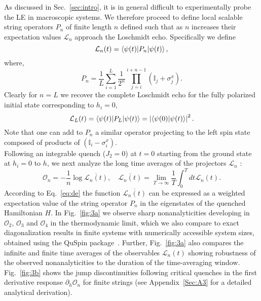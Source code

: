 \documentclass[aps,prx,twocolumn]{revtex4-2}
\begin{document}
As discussed in Sec.~\ref{sec:intro}, it is in general difficult to experimentally probe the LE in macroscopic systems. We therefore proceed to define local scalable string operators $P_n$ of finite length $n$  {defined such that as $n$ increases their expectation values $\mathcal L_n$ approach the Loschmidt echo.  Specifically we define} 
\begin{equation}\label{eq:ln}
\mathcal{L}_n(t)=\braket{\psi(t)|P_n|\psi(t)},
\end{equation}  
where,
 {
\begin{equation}\label{eq:string}
P_n=\frac{1}{L}\sum\limits_{i=1}^{L}\frac{1}{2^n}\prod\limits_{j=i}^{i+n-1}\left(\mathbb{I}_j+\sigma_j^x\right).
\end{equation}
}
Clearly for $n=L$ we recover the complete Loschmidt echo  {for the fully polarized initial state corresponding to $h_i=0$,}
\begin{equation}
\mathcal{L}_L(t)=\braket{\psi(t)|P_L|\psi(t)}=\left|\braket{\psi(0)|\psi(t)}\right|^2.
\end{equation}
{Note that one can add to $P_n$ a similar operator projecting to the  {left} spin state composed of products of $\left(\mathbb{I}_i-\sigma_i^x\right).$}\\

Following an integrable quench ($J_2=0$) at $t=0$ starting from the ground state at $h_i=0$ to $h$,   {we next analyze} the long time averages of the projectors $\mathcal L_n$ {:
\begin{equation}
\label{eq:On_def}
\mathcal{O}_n=-\frac{1}{n}\log \overline {\mathcal L_n(t)},\quad \overline {\mathcal L_n(t)}=\lim\limits_{T\rightarrow\infty}\frac{1}{T}\int_{0}^{T}dt \mathcal L_n(t).
\end{equation}
According to Eq.~\eqref{eq:de} the function $\overline {\mathcal L_n(t)}$ can be expressed as a weighted expectation value of the string operator $P_n$ in the eigenstates of the quenched Hamiltonian $H$}. In Fig.~\ref{fig:3a} we observe sharp nonanalyticities developing in $\mathcal{O}_2$, $\mathcal{O}_3$ and $\mathcal{O}_4$ in the thermodynamic limit,   {which we also compare} to exact diagonalization results in finite systems with numerically accessible system sizes,~ {obtained using the QuSpin package~\cite{bukov1,bukov2}.  Further, Fig.~\ref{fig:3a} also compares the infinite and finite time averages of the observables $\mathcal L_n(t)$ showing robustness of the observed nonanalyticities to the duration of the time-averaging window.} Fig.~\ref{fig:3b} shows the jump discontinuities following critical quenches in the first derivative response $\partial_h\mathcal{O}_n$ for finite strings (see Appendix~\ref{Sec:A3} for a detailed analytical derivation).
\end{document}

